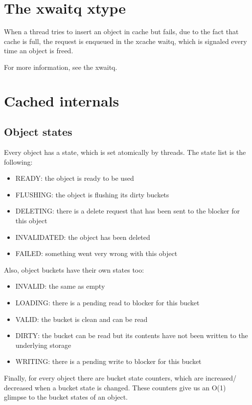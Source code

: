 \section{The xwaitq xtype}

When a thread tries to insert an object in cache but fails, due to the fact
that cache is full, the request is enqueued in the xcache waitq, which is
signaled every time an object is freed.

For more information, see the xwaitq.

\section{Cached internals}

\subsection{Object states}

Every object has a state, which is set atomically by threads. The state list is
the following:

\begin{itemize}
	\item READY: the object is ready to be used
	\item FLUSHING: the object is flushing its dirty buckets
	\item DELETING: there is a delete request that has been sent to the 
		blocker for this object
	\item INVALIDATED: the object has been deleted
	\item FAILED: something went very wrong with this object
\end{itemize}

Also, object buckets have their own states too:

\begin{itemize}
	\item INVALID: the same as empty
	\item LOADING: there is a pending read to blocker for this bucket
	\item VALID: the bucket is clean and can be read
	\item DIRTY: the bucket can be read but its contents have not been
		written to the underlying storage
	\item WRITING: there is a pending write to blocker for this bucket
\end{itemize}

Finally, for every object there are bucket state counters, which are increased/
decreased when a bucket state is changed. These counters give us an O(1)
glimpse to the bucket states of an object.

